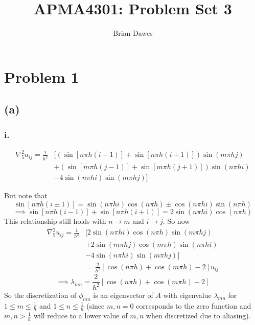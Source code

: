 \documentclass{article}
\begin{document}
\title{APMA4301: Problem Set 3}
\author{Brian Dawes}
\maketitle

\section*{Problem 1}
\subsection*{(a)}
\subsubsection*{i.}
\begin{align}
\nabla_5^2 u_{ij}=\frac{1}{h^2}&\big[(\sin[n\pi h(i-1)]+\sin[n\pi h(i+1)])\sin(m\pi hj) \nonumber\\
& +(\sin[m\pi h(j-1)]+\sin[m\pi h(j+1)])\sin(n\pi hi) \nonumber \\
& -4\sin(n\pi hi)\sin(m\pi hj)\big] 
\end{align}

But note that
\begin{equation}
\sin[n\pi h(i\pm 1)]=\sin(n\pi hi)\cos(n\pi h)\pm\cos(n\pi hi)\sin(n\pi h)
\end{equation}
\begin{equation}
\implies \sin[n\pi h(i-1)]+\sin[n\pi h(i+1)]=2\sin(n\pi hi)\cos(n\pi h)
\end{equation}
This relationship still holds with $n\to m$ and $i\to j$.
So now 
\begin{align}
\nabla_5^2 u_{ij}=\frac{1}{h^2}&\big[2\sin(n\pi hi)\cos(n\pi h)\sin(m\pi hj) \nonumber\\
& +2\sin(m\pi hj)\cos(m\pi h)\sin(n\pi hi) \nonumber \\
& -4\sin(n\pi hi)\sin(m\pi hj)\big] \nonumber \\
& =\frac{2}{h^2}[\cos(n\pi h)+\cos(m\pi h)-2]u_{ij}
\end{align}
\begin{equation}
\implies\boxed{\lambda_{mn}=\frac{2}{h^2}[\cos(n\pi h)+\cos(m\pi h)-2]}
\end{equation}
So the discretization of $\phi_{mn}$ is an eigenvector of $A$ with eigenvalue $\lambda_{mn}$ for $1\leq m\leq\frac{1}{h}$ and $1\leq n\leq\frac{1}{h}$ (since $m,n=0$ corresponds to the zero function and $m,n>\frac{1}{h}$ will reduce to a lower value of $m,n$ when discretized due to aliasing).
\end{document}
